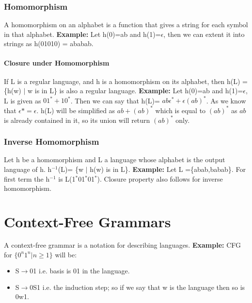 \documentclass{report}
\begin{document}
\subsection{Homomorphism}
A homomorphism on an alphabet is a function that gives a string for each symbol in that alphabet. \textbf{Example:} Let h(0)=ab and h(1)=$\epsilon$, then we can extent it into strings as h(01010) = ababab.
\subsubsection{Closure under Homomorphism}
If L is a regular language, and h is a homomorphism on its alphabet, then h(L) = \{h(w) 
$|$ w is in L\} is also a regular language. \textbf{Example:} Let h(0)=ab and h(1)=$\epsilon$, L is given as $01^* + 10^*$. Then we can say that h(L)= $ab \epsilon^* + \epsilon(ab)^*$. As we know that $\epsilon* = \epsilon$. h(L) will be simplified as $ab + (ab)^*$ which is equal to $(ab)^*$ as $ab$ is already contained in it, so its union will return $(ab)^*$ only. 

\subsection{Inverse Homomorphism}
Let h be a homomorphism and L a language whose alphabet is the output language of h. h$^{-1}$(L)= \{w $|$ h(w) is in L\}. \textbf{Example:} Let L =\{abab,babab\}. For first term the h$^{-1}$ is L(1$^*$01$^*$01$^*$). Closure property also follows for inverse homomorphism. 

\chapter{Context-Free Grammars}
A context-free grammar is a notation for describing languages. \textbf{Example:} CFG for $\{0^n1^n|n\geqslant1\}$ will be:
\begin{itemize}
    \item S$\rightarrow$01 i.e. basis is 01 in the language. 
    \item S$\rightarrow$0S1 i.e. the induction step; so if we say that w is the language then so is 0w1. 
\end{itemize}
\end{document}
